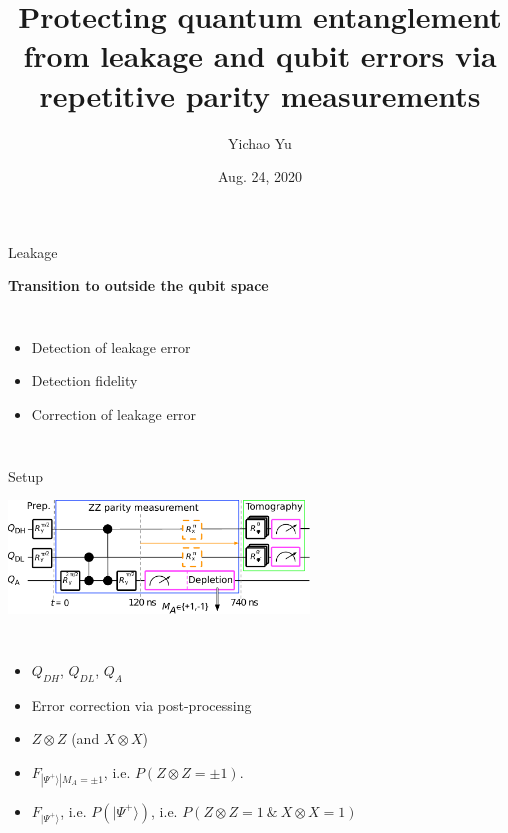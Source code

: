 \documentclass[xcolor={table}]{beamer}
\title[Detecting leakage error]{Protecting quantum entanglement from leakage and qubit errors via repetitive parity measurements}
\date{Aug. 24, 2020}
\author{Yichao Yu}
\institute{Ni Group}
\begin{document}
\begin{frame}{}
  \titlepage
\end{frame}

\begin{frame}{Leakage}
  \begin{center}
    \textbf{Transition to outside the qubit space}\\
    \begin{columns}
      \column{8cm}
      \begin{itemize}
      \item<2-> Detection of leakage error
      \item<3-> Detection fidelity
      \item<4-> Correction of leakage error
      \end{itemize}
    \end{columns}
  \end{center}
\end{frame}

\begin{frame}{Setup}
  \begin{center}
    \includegraphics[width=8cm]{setup1}
    \begin{columns}
      \column{10cm}
      \begin{itemize}
      \item<2-> $Q_{DH}$, $Q_{DL}$, $Q_{A}$
      \item<3-> Error correction via post-processing\\
      \item<5->$Z\otimes Z$ (and $X\otimes X$)
      \item<6->$F_{|\Psi^+\rangle|M_A={\pm1}}$, i.e. $P(Z\otimes Z=\pm1)$.
      \item<7->$F_{|\Psi^+\rangle}$, i.e. $P(|\Psi^+\rangle)$, i.e. $P(Z\otimes Z=1\ \&\ X\otimes X=1)$
      \end{itemize}
    \end{columns}
  \end{center}
\end{frame}
\end{document}
